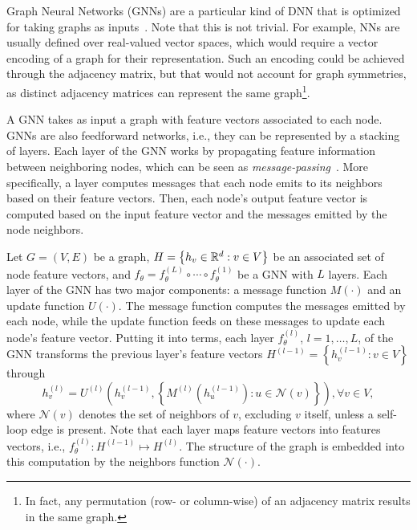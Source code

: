 Graph Neural Networks (GNNs) are a particular kind of DNN that is optimized for taking graphs as inputs~\cite{sanchez-lengelingGentleIntroductionGraph2021}.
Note that this is not trivial.
For example, NNs are usually defined over real-valued vector spaces, which would require a vector encoding of a graph for their representation.
Such an encoding could be achieved through the adjacency matrix, but that would not account for graph symmetries, as distinct adjacency matrices can represent the same graph\footnote{In fact, any permutation (row- or column-wise) of an adjacency matrix results in the same graph.}.

A GNN takes as input a graph with feature vectors associated to each node.
GNNs are also feedforward networks, i.e., they can be represented by a stacking of layers.
Each layer of the GNN works by propagating feature information between neighboring nodes, which can be seen as \emph{message-passing}~\cite{gilmerNeuralMessagePassing2017}.
More specifically, a layer computes messages that each node emits to its neighbors based on their feature vectors.
Then, each node's output feature vector is computed based on the input feature vector and the messages emitted by the node neighbors.

Let $G=(V,E)$ be a graph, $H =\left\{ h_v\in \mathbb{R}^{d}: v\in V \right\} $ be an associated set of node feature vectors, and $f_\theta = f_\theta^{(L)} \circ \cdots \circ f_\theta^{(1)}$ be a GNN with $L$ layers.
Each layer of the GNN has two major components: a message function $M(\cdot)$ and an update function $U(\cdot)$.
The message function computes the messages emitted by each node, while the update function feeds on these messages to update each node's feature vector.
Putting it into terms, each layer $f^{(l)}_\theta$, $l=1,\ldots,L$, of the GNN transforms the previous layer's feature vectors $H^{(l-1)}=\left\{ h^{(l-1)}_v : v \in V \right\}$ through 
\[
     h^{(l)}_v = U^{(l)}\left( h^{(l-1)}_v , \left\{ M^{(l)}(h^{(l-1)}_u):u\in \mathcal{N}(v) \right\}  \right) , \forall v \in V
,\] where $\mathcal{N}(v)$ denotes the set of neighbors of $v$, excluding $v$ itself, unless a self-loop edge is present.
Note that each layer maps feature vectors into features vectors, i.e., $f_\theta^{(l)}: H^{(l-1)} \mapsto H^{(l)}$.
The structure of the graph is embedded into this computation by the neighbors function $\mathcal{N}(\cdot)$.


